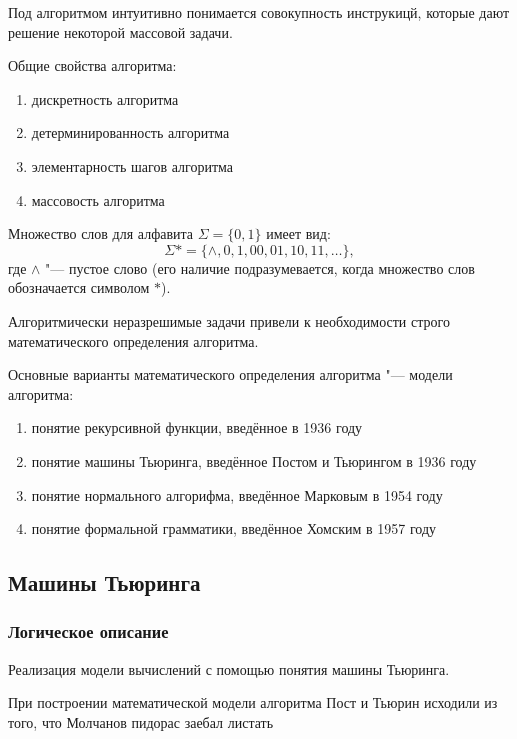 \documentclass{article}
\begin{document}
Под алгоритмом интуитивно понимается совокупность инструкицй, которые дают решение некоторой массовой задачи.

Общие свойства алгоритма:

\begin{enumerate}
    \item дискретность алгоритма
    \item детерминированность алгоритма
    \item элементарность шагов алгоритма
    \item массовость алгоритма
\end{enumerate}

Множество слов для алфавита $\Sigma = \{0,1\}$ имеет вид:
\begin{equation}
    \Sigma* = \{\land, 0, 1, 00, 01, 10, 11, \dots\},
\end{equation}
где $\land$ "--- пустое слово (его наличие подразумевается, когда множество слов обозначается символом $*$).

Алгоритмически неразрешимые задачи привели к необходимости строго математического определения алгоритма.

Основные варианты математического определения алгоритма "--- модели алгоритма:
\begin{enumerate}
    \item понятие рекурсивной функции, введённое в 1936 году
    \item понятие машины Тьюринга, введённое Постом и Тьюрингом в 1936 году
    \item понятие нормального алгорифма, введённое Марковым в 1954 году
    \item понятие формальной грамматики, введённое Хомским в 1957 году
\end{enumerate}

\subsection{Машины Тьюринга}
\subsubsection{Логическое описание}
Реализация модели вычислений с помощью понятия машины Тьюринга.

При построении математической модели алгоритма Пост и Тьюрин исходили из того, что Молчанов пидорас заебал листать
\end{document}
